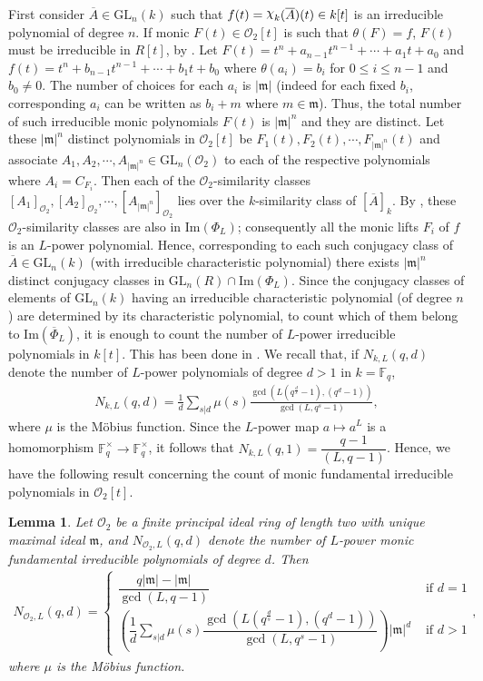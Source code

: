\documentclass[11pt,twoside]{amsart}
\newcommand{\GL}{\mathrm{GL}}
\newcommand{\im}{\mathrm{Im}}
\newcommand{\upchi}{\raisebox{0.4ex}{$\chi$}}
\newcommand{\Char}{\upchi}
\newcommand{\R}{\mathscr{O}_2}
\newcommand{\Fq}{\mathbb{F}_q}
\newtheorem{lemma}{Lemma}[section]
\theoremstyle{definition} %
\begin{document}
First consider $\overline{A}\in \GL_n(k)$ such that $f(t)=\Char_{k}(\overline{A})(t)\in k[t]$ is an irreducible polynomial of degree $n$. 
If monic $F(t)\in \R[t]$ is such that $\theta(F)=f$, $F(t)$ must be irreducible in $R[t]$, by . 
Let $F(t)=t^n+a_{n-1}t^{n-1}+\cdots+a_1t+a_0$ and $f(t)= t^n+b_{n-1}t^{n-1}+\cdots+b_1t+b_0$ where $\theta({a_i})=b_i$ for $0\leq i\leq n-1$ and $b_0\neq 0$.
The number of choices for  each $a_i$ is $|\mathfrak{m}|$ (indeed for each fixed $b_i$, corresponding $a_i$ can be written as $b_i+m$ where $m\in \mathfrak{m}$). Thus, the total number of such irreducible monic polynomials $F(t)$ is $|\mathfrak{m}|^n$ and they are distinct.
Let these $|\mathfrak{m}|^n$ distinct polynomials in $\R[t]$ be $F_1(t),F_2(t),\cdots,F_{|\mathfrak{m}|^n}(t)$ and associate $A_1,A_2,\cdots,A_{|\mathfrak{m}|^n}\in\GL_n(\R)$ to each of the respective polynomials where $A_i=C_{F_i}$.
Then each of the $\R$-similarity classes $[A_1]_{\R},[A_2]_{\R},\cdots,[A_{|\mathfrak{m}|^n}]_{\R}$ lies over the $k$-similarity class of $[\overline{A}]_k$.
By , these $\R$-similarity classes are also in $\im(\Phi_L)$; consequently all the monic lifts $F_i$ of $f$ is an $L$-power polynomial.
Hence, corresponding to each such conjugacy class of $\overline{A}\in\GL_n(k)$ (with irreducible characteristic polynomial) there exists $|\mathfrak{m}|^n$ distinct conjugacy classes in $\GL_n(R)\cap\im(\Phi_L)$.
Since the conjugacy classes of elements of $\GL_n(k)$ having an irreducible characteristic polynomial (of degree $n$) are determined by its characteristic polynomial, to count which of them belong to $\im(\overline{\Phi}_L)$, it is enough to count the number of $L$-power irreducible polynomials in $k[t]$.
This has been done in \cite[Proposition 3.3]{KunduSinghGL}. 
We recall that, if $N_{k,L}(q,d)$ denote the number of $L$-power polynomials of degree $d>1$ in $k=\Fq$, 
\begin{align*}
    N_{k,L}(q,d)=\frac{1}{d}\sum_{s|d}\mu(s)\frac{\gcd(L(q^{\frac{d}{s}}-1),(q^d-1))}{\gcd(L,q^s-1)},
\end{align*}
where $\mu$ is the M\"{o}bius function.
Since the $L$-power map $a\mapsto a^L$ is a homomorphism $\Fq^\times\longrightarrow\Fq^\times$, it follows that $N_{k,L}(q,1)=\dfrac{q-1}{(L,q-1)}$.
Hence, we have the following result concerning the count of monic fundamental irreducible polynomials in $\R[t]$.
\begin{lemma}\label{lem:count-fund-irred-L}
    Let $\R$ be a finite principal ideal ring of length two with unique maximal ideal $\mathfrak{m}$, and $N_{{\R}, L}(q,d)$ denote the number of $L$-power monic fundamental irreducible polynomials of degree $d$. Then
    \begin{align*}
        N_{{\R}, L}(q,d)=\begin{cases}
        \dfrac{q|\mathfrak{m}|-|\mathfrak{m}|}{\gcd(L,q-1)}&\text{ if }d=1\\
        \left(\dfrac{1}{d}\sum_{s|d}\mu(s)\dfrac{\gcd(L(q^{\frac{d}{s}}-1),(q^d-1))}{\gcd(L,q^s-1)}\right)|\mathfrak{m}|^d &\text{ if } d>1
        \end{cases},
    \end{align*}
    where $\mu$ is the M\"{o}bius function.
\end{lemma}
\end{document}

